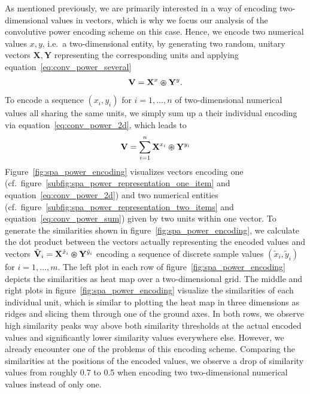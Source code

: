 As mentioned previously, we are primarily interested in a way of encoding two-dimensional values in vectors, which is why we focus our analysis of the convolutive power encoding scheme on this case.
Hence, we encode two numerical values $x,y$, i.e.\ a two-dimensional entity, by generating two random, unitary vectors $ \mathbf{X}, \mathbf{Y} $ representing the corresponding units and applying equation~\eqref{eq:conv_power_several} 
\begin{equation}
\label{eq:conv_power_2d}
\mathbf{V} = \mathbf{X}^{x} \varoast \mathbf{Y}^{y}.
\end{equation}
To encode a sequence $ \left(x_{i}, y_{i}\right) $ for $i=1, \ldots, n$ of two-dimensional numerical values all sharing the same units, we simply sum up a their individual encoding via equation~\eqref{eq:conv_power_2d}, which leads to
\begin{equation}
\label{eq:conv_power_sum}
\mathbf{V} = \sum\limits_{i=1}^{n} \mathbf{X}^{x_i} \varoast \mathbf{Y}^{y_i}
\end{equation}
Figure~\ref{fig:spa_power_encoding} visualizes vectors encoding one (cf.\ figure~\ref{subfig:spa_power_representation_one_item} and equation~\eqref{eq:conv_power_2d}) and two numerical entities (cf.\ figure~\ref{subfig:spa_power_representation_two_items} and equation~\eqref{eq:conv_power_sum}) given by two units within one vector.
To generate the similarities shown in figure~\ref{fig:spa_power_encoding}, we calculate the dot product between the vectors actually representing the encoded values and vectors $ \tilde{\mathbf{V}}_{i} = \mathbf{X}^{\tilde{x}_{i}} \varoast \mathbf{Y}^{\tilde{y}_i} $ encoding a sequence of discrete sample values $ \left( \tilde{x}_{i}, \tilde{y}_{i} \right)$ for $i=1, \ldots, m$.
The left plot in each row of figure~\ref{fig:spa_power_encoding} depicts the similarities as heat map over a two-dimensional grid. 
The middle and right plots in figure~\ref{fig:spa_power_encoding} visualize the similarities of each individual unit, which is similar to plotting the heat map in three dimensions as ridges and slicing them through one of the ground axes.
In both rows, we observe high similarity peaks way above both similarity thresholds at the actual encoded values and significantly lower similarity values everywhere else.
However, we already encounter one of the problems of this encoding scheme.
Comparing the similarities at the positions of the encoded values, we observe a drop of similarity values from roughly \num{0.7} to \num{0.5} when encoding two two-dimensional numerical values instead of only one.
